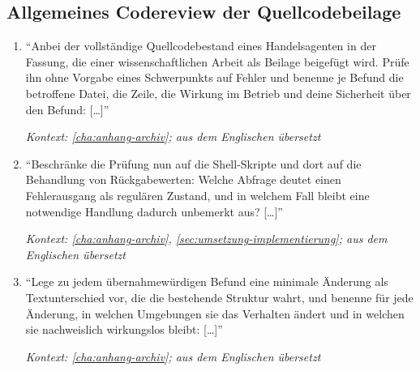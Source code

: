 \subsection{Allgemeines Codereview der Quellcodebeilage}
\label{sec:prompts-kimi-codereview}
\begin{enumerate}
    \item \enquote{Anbei der vollständige Quellcodebestand eines
            Handelsagenten in der Fassung, die einer wissenschaftlichen
            Arbeit als Beilage beigefügt wird. Prüfe ihn ohne Vorgabe eines
            Schwerpunkts auf Fehler und benenne je Befund die betroffene
            Datei, die Zeile, die Wirkung im Betrieb und deine Sicherheit über
            den Befund: [\dots]}
            \par\hfill\textit{Kontext: \cref{cha:anhang-archiv}; aus dem
            Englischen übersetzt}

    \item \enquote{Beschränke die Prüfung nun auf die Shell-Skripte und dort
            auf die Behandlung von Rückgabewerten: Welche Abfrage deutet einen
            Fehlerausgang als regulären Zustand, und in welchem Fall bleibt
            eine notwendige Handlung dadurch unbemerkt aus? [\dots]}
            \par\hfill\textit{Kontext: \cref{cha:anhang-archiv},
            \cref{sec:umsetzung-implementierung}; aus dem Englischen
            übersetzt}

    \item \enquote{Lege zu jedem übernahmewürdigen Befund eine minimale
            Änderung als Textunterschied vor, die die bestehende Struktur
            wahrt, und benenne für jede Änderung, in welchen Umgebungen sie
            das Verhalten ändert und in welchen sie nachweislich wirkungslos
            bleibt: [\dots]}
            \par\hfill\textit{Kontext: \cref{cha:anhang-archiv}; aus dem
            Englischen übersetzt}
\end{enumerate}

